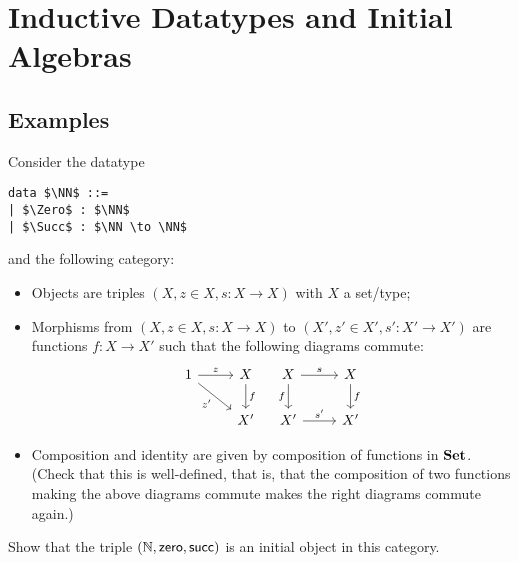 
\section{Inductive Datatypes and Initial Algebras}
\label{sec:initial-algs}

\subsection{Examples}
\label{sec:examples}



\begin{exer}
  Consider the datatype
\begin{lstlisting}[mathescape=true]
data $\NN$ ::=
| $\Zero$ : $\NN$
| $\Succ$ : $\NN \to \NN$
\end{lstlisting}
and the following  category:
  \begin{itemize}
  \item Objects are triples $(X, z \in X, s : X \to X)$ with $X$ a set/type;
  \item Morphisms from $(X, z \in X, s : X \to X)$ to $(X', z' \in X', s' : X' \to X')$ are functions
    $f : X \to X'$ such that the following diagrams commute:
    \[
      \begin{tikzcd}
        1 \ar[r, "z"] \ar[rd, "z'"']
        &
        X \ar[d, "f"]
        \\
        &
        X'
      \end{tikzcd}
      \quad
      \begin{tikzcd}
        X \ar[r, "s"] \ar[d, "f"']
        &
        X \ar[d, "f"]
        \\
        X' \ar[r, "s'"]
        &
        X'
      \end{tikzcd}
    \]
  \item Composition and identity are given by composition of functions in $\mathbf{Set}$.
    (Check that this is well-defined, that is, that the composition of two functions making the above diagrams commute makes the right diagrams commute again.)
  \end{itemize}

  Show that the triple $(\mathbb{N}, \mathsf{zero}, \mathsf{succ})$ is an initial object in this category.
\end{exer}

